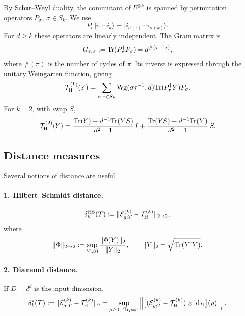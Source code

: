 \documentclass{article}
\theoremstyle{definition}
\begin{document}
By Schur--Weyl duality, the commutant of $U^{\otimes k}$ is spanned by
permutation operators $P_\sigma$, $\sigma\in S_k$.  We use
\begin{equation}
    P_\sigma|i_1\cdots i_k\rangle
    =|i_{\sigma(1)}\cdots i_{\sigma(k)}\rangle.
\end{equation}
For $d\ge k$ these operators are linearly independent.  The Gram matrix is
\begin{equation}
    G_{\tau,\sigma}
    :={\rm Tr}(P_\tau^\dagger P_\sigma)
    =d^{\#(\tau^{-1}\sigma)},
\end{equation}
where $\#(\pi)$ is the number of cycles of $\pi$.  Its inverse is expressed
through the unitary Weingarten function, giving
\begin{equation}
    {\cal T}_{\rm H}^{(k)}(Y)
    =\sum_{\sigma,\tau\in S_k}
      {\rm Wg}(\sigma\tau^{-1},d)
      {\rm Tr}(P_\tau^\dagger Y)P_\sigma.
\end{equation}
For $k=2$, with swap $S$,
\begin{equation}
    {\cal T}_{\rm H}^{(2)}(Y)
    =\frac{{\rm Tr}(Y)-d^{-1}{\rm Tr}(YS)}{d^2-1}\,I
     +\frac{{\rm Tr}(YS)-d^{-1}{\rm Tr}(Y)}{d^2-1}\,S.
\end{equation}

\subsection{Distance measures}

Several notions of distance are useful.

\paragraph{1. Hilbert--Schmidt distance.}
\begin{equation}
    \delta_k^{\rm HS}(T)
    :=\|{\cal E}_{g;T}^{(k)}-{\cal T}_{\rm H}^{(k)}\|_{2\to2},
\end{equation}
where
\begin{equation}
    \|\Phi\|_{2\to2}
    :=\sup_{Y\neq0}\frac{\|\Phi(Y)\|_2}{\|Y\|_2},
    \qquad
    \|Y\|_2=\sqrt{{\rm Tr}(Y^\dagger Y)}.
\end{equation}

\paragraph{2. Diamond distance.}
If $D=d^k$ is the input dimension,
\begin{equation}
    \delta_k^\diamond(T)
    :=\|{\cal E}_{g;T}^{(k)}-{\cal T}_{\rm H}^{(k)}\|_\diamond
    =\sup_{\rho\ge0,\ {\rm Tr}\rho=1}
      \left\|
       \bigl[({\cal E}_{g;T}^{(k)}-{\cal T}_{\rm H}^{(k)})
       \otimes{\rm id}_{D}\bigr](\rho)
      \right\|_1.
\end{equation}
\end{document}
